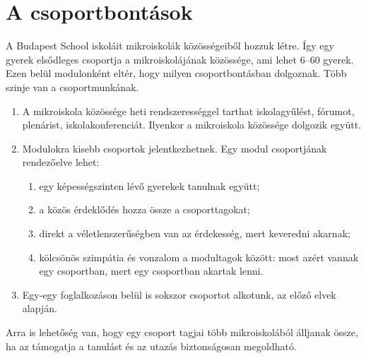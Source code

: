 \section{A csoportbontások}
\label{sec:csoportok}

A Budapest School iskoláit mikroiskolák közösségeiből hozzuk létre. Így egy gyerek elsődleges csoportja a mikroiskolájának közössége, ami lehet 6--60  gyerek. Ezen belül modulonként eltér, hogy milyen csoportbontásban dolgoznak. Több szinje van a csoportmunkának.
\begin{enumerate}
      \item A mikroiskola közössége heti rendszerességgel tarthat iskolagyűlést, fórumot, plenárist, iskolakonferenciát. Ilyenkor a mikroiskola közössége dolgozik együtt.
      \item  Modulokra kisebb csoportok jelentkezhetnek. Egy modul csoportjának rendezőelve lehet:
            \begin{enumerate}
                  \item egy képességszinten lévő gyerekek tanulnak együtt;
                  \item a közös érdeklődés hozza össze a csoporttagokat;
                  \item  direkt a véletlenszerűségben van az érdekesség, mert keveredni akarnak;
                  \item kölcsönös szimpátia és vonzalom a modultagok között: most azért vannak egy csoportban, mert egy csoportban akartak lenni.
            \end{enumerate}
      \item  Egy-egy foglalkozáson belül is sokszor csoportot alkotunk, az előző elvek alapján.

\end{enumerate}

Arra is lehetőség van, hogy egy csoport tagjai több mikroiskolából álljanak össze, ha az támogatja a tanulást és az utazás biztonságosan megoldható.